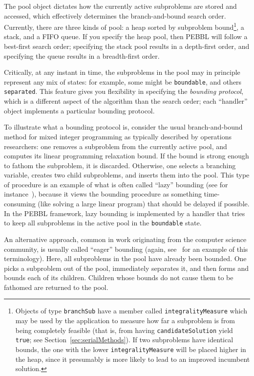 The pool object dictates how the currently active subproblems are
stored and accessed, which effectively determines the branch-and-bound
search order.  Currently, there are three kinds of pool: a heap sorted
by subproblem bound\footnote{Objects of type \texttt{branchSub} have a
member called \texttt{integralityMeasure} which may be used by the
application to measure how far a subproblem is from being completely
feasible (that is, from having \texttt{candidateSolution} yield
\texttt{true}; see Section~\ref{sec:serialMethods}).  If two
subproblems have identical bounds, the one with the lower
\texttt{integralityMeasure} will be placed higher in the heap, since
it presumably is more likely to lead to an improved incumbent
solution.}, a stack, and a FIFO queue.  If you specify the heap
pool, then PEBBL will follow a best-first search order; specifying the
stack pool results in a depth-first order, and specifying the queue
results in a breadth-first order. 

Critically, at any instant in time, the subproblems in the pool may in
principle represent any mix of states: for example, some might be
\texttt{boundable}, and others \texttt{separated}.  This feature gives
you flexibility in specifying the \emph{bounding protocol}, which is a
different aspect of the algorithm than the search order; each
``handler'' object implements a particular bounding protocol.

To illustrate what a bounding protocol is, consider the usual
branch-and-bound method for mixed integer programming as typically
described by operations researchers: one removes a subproblem from the
currently active pool, and computes its linear programming relaxation
bound.  If the bound is strong enough to fathom the subproblem, it is
discarded.  Otherwise, one selects a branching variable, creates two
child subproblems, and inserts them into the pool.  This type of
procedure is an example of what is often called ``lazy'' bounding (see
for instance~\cite{CP99}), because it views the bounding procedure as
something time-consuming (like solving a large linear program) that
should be delayed if possible.  In the PEBBL framework, lazy bounding
is implemented by a handler that tries to keep all subproblems in the
active pool in the \texttt{boundable} state.

An alternative approach, common in work originating from the computer
science community, is usually called ``eager'' bounding (again,
see~\cite{CP99} for an example of this terminology).  Here, all
subproblems in the pool have already been bounded.  One picks a
subproblem out of the pool, immediately separates it,
and then forms and bounds each of its children.  Children whose bounds do
not cause them to be fathomed are returned to the pool.  

